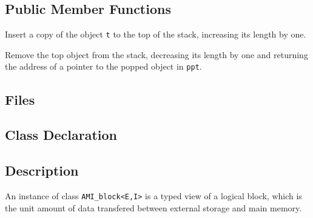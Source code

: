 \subsection{Public Member Functions}
   \btabb 

       {Insert a copy of the
      object \lstinline|t| to the top of the stack, increasing its length by
      one.}

        {Remove the top object from
       the stack, decreasing its length by one and returning the address of
       a pointer to the popped object in \lstinline|ppt|.}

   \etabb



\subsection{Files}
  \btabb
         {}
  \etabb

\subsection{Class Declaration}
\btabb {}

   \etabb

\subsection{Description}

An instance of class \lstinline|AMI_block<E,I>| is a typed
view of a logical block, which is the unit amount of data transfered
between external storage and main memory. 

